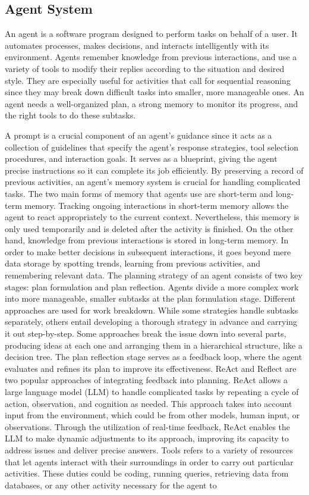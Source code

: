     \subsection{Agent System}
    An agent is a software program designed to perform tasks on behalf of a user. It automates processes, makes decisions, and interacts intelligently with its environment. Agents remember knowledge from previous interactions, and use a variety of tools to modify their replies according to the situation and desired style. They are especially useful for activities that call for sequential reasoning since they may break down difficult tasks into smaller, more manageable ones. An agent needs a well-organized plan, a strong memory to monitor its progress, and the right tools to do these subtasks.

    A prompt is a crucial component of an agent's guidance since it acts as a collection of guidelines that specify the agent's response strategies, tool selection procedures, and interaction goals. It serves as a blueprint, giving the agent precise instructions so it can complete its job efficiently. By preserving a record of previous activities, an agent's memory system is crucial for handling complicated tasks. The two main forms of memory that agents use are short-term and long-term memory. Tracking ongoing interactions in short-term memory allows the agent to react appropriately to the current context. Nevertheless, this memory is only used temporarily and is deleted after the activity is finished. On the other hand, knowledge from previous interactions is stored in long-term memory. In order to make better decisions in subsequent interactions, it goes beyond mere data storage by spotting trends, learning from previous activities, and remembering relevant data. The planning strategy of an agent consists of two key stages: plan formulation and plan reflection. Agents divide a more complex work into more manageable, smaller subtasks at the plan formulation stage. Different approaches are used for work breakdown. While some strategies handle subtasks separately, others entail developing a thorough strategy in advance and carrying it out step-by-step. Some approaches break the issue down into several parts, producing ideas at each one and arranging them in a hierarchical structure, like a decision tree. The plan reflection stage serves as a feedback loop, where the agent evaluates and refines its plan to improve its effectiveness. ReAct and Reflect are two popular approaches of integrating feedback into planning. ReAct allows a large language model (LLM) to handle complicated tasks by repeating a cycle of action, observation, and cognition as needed. This approach takes into account input from the environment, which could be from other models, human input, or observations. Through the utilization of real-time feedback, ReAct enables the LLM to make dynamic adjustments to its approach, improving its capacity to address issues and deliver precise answers. Tools refers to a variety of resources that let agents interact with their surroundings in order to carry out particular activities. These duties could be coding, running queries, retrieving data from databases, or any other activity necessary for the agent to 